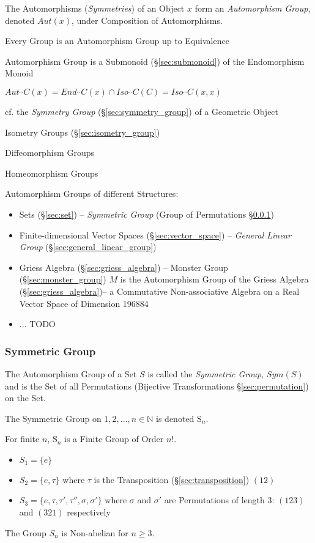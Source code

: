 The Automorphisms (\emph{Symmetries}) of an Object $x$ form an
\emph{Automorphism Group}, denoted $Aut(x)$, under Composition of Automorphisms.

Every Group is an Automorphism Group up to Equivalence %

Automorphism Group is a Submonoid (\S\ref{sec:submonoid}) of the Endomorphism
Monoid %

$Aut_\cat{C}(x) = End_\cat{C}(x) \cap Iso_\cat{C}(C) = Iso_\cat{C}(x,x)$

\fist cf. the \emph{Symmetry Group} (\S\ref{sec:symmetry_group}) of a Geometric
Object %

Isometry Groups (\S\ref{sec:isometry_group})

Diffeomorphism Groups %

Homeomorphism Groups %

Automorphism Groups of different Structures:
\begin{itemize}
  \item Sets (\S\ref{sec:set}) -- \emph{Symmetric Group} (Group of Permutations
    \S\ref{sec:symmetric_group})
  \item Finite-dimensional Vector Spaces (\S\ref{sec:vector_space}) --
    \emph{General Linear Group} (\S\ref{sec:general_linear_group})
  \item Griess Algebra (\S\ref{sec:griess_algebra}) -- Monster Group
    (\S\ref{sec:monster_group}) $M$ is the Automorphism Group of the Griess
    Algebra (\S\ref{sec:griess_algebra})-- a Commutative Non-associative Algebra
    on a Real Vector Space of Dimension 196884
  \item ... TODO
\end{itemize}



\subsubsection{Symmetric Group}\label{sec:symmetric_group}

The Automorphism Group of a Set $S$ is called the \emph{Symmetric Group},
$Sym(S)$ and is the Set of all Permutations (Bijective Transformations
\S\ref{sec:permutation}) on the Set.

The Symmetric Group on ${1, 2, ..., n} \in \mathbb{N}$ is denoted
$\mathrm{S}_n$.

For finite $n$, $\mathrm{S}_n$ is a Finite Group of Order $n!$.

\begin{itemize}
    \item $S_1 = \{e\}$
    \item $S_2 = \{e,\tau\}$ where $\tau$ is the Transposition
      (\S\ref{sec:transposition}) $(12)$
    \item $S_3 = \{e, \tau, \tau', \tau'', \sigma, \sigma'\}$ where $\sigma$ and
      $\sigma'$ are Permutations of length 3: $(123)$ and $(321)$ respectively
\end{itemize}
The Group $S_n$ is Non-abelian for $n \geq 3$.

